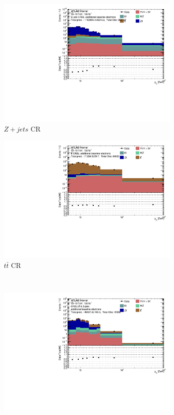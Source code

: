\begin{figure}[htb]
    \begin{subfigure}{.48\textwidth}
        \centering
        \includegraphics[width=.9\linewidth]{figures/Analysis/Background/Overlay_pt_Baseline_elecs_ZplusX.pdf}
        \caption{$Z+jets$ CR}
    \end{subfigure}
    \begin{subfigure}{.48\textwidth}
        \centering
        \includegraphics[width=.9\linewidth]{figures/Analysis/Background/Overlay_pt_Baseline_elecs_ttbar.pdf}
        \caption{$t\bar{t}$ CR}
    \end{subfigure}\\
    \begin{subfigure}{.48\textwidth}
        \centering
        \includegraphics[width=.9\linewidth]{figures/Analysis/Background/Overlay_pt_Baseline_elecs_Combined.pdf}

\end{subfigure}
\end{figure}
